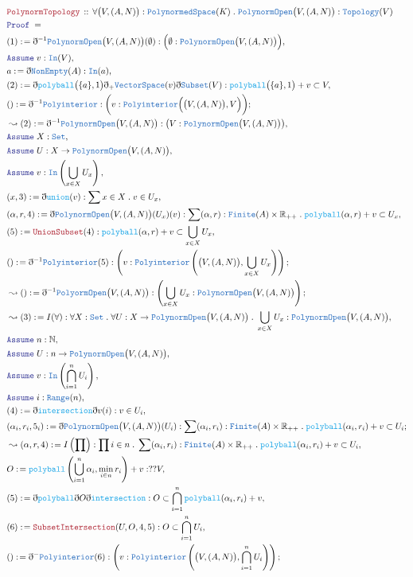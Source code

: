 \documentclass[12pt]{scrartcl}
\newcommand{\TYPE}[1]{\textcolor{NavyBlue}{\mathtt{#1}}}
\newcommand{\FUNC}[1]{\textcolor{Cerulean}{\mathtt{#1}}}
\newcommand{\LOGIC}[1]{\textcolor{Blue}{\mathtt{#1}}}
\newcommand{\THM}[1]{\textcolor{Maroon}{\mathtt{#1}}}
\renewcommand{\.}{\; . \;}
\newcommand{\de}{: \kern 0.1pc =}
\newcommand{\Theorem}[2]{& \THM{#1} \, :: \, #2 \\ & \Proof = \\ }
\newcommand{\Page}[1]{\begin{align*} #1 \end{align*} \newpage   }
\newcommand{ \bd }{ \ByDef }
\newcommand{\Reals}{\mathbb{R} }
\newcommand{\Nat}{\mathbb{N} }
\newcommand{\Set}{\TYPE{Set}}
\newcommand{\Say}[3]{& #1 \de #2 : #3, \\}
\newcommand{\Conclude}[3]{& #1 \de #2 : #3; \\}
\newcommand{\Derive}[3]{& \leadsto #1 \de #2 : #3, \\}
\newcommand{\DeriveConclude}[3]{& \leadsto #1 \de #2 : #3 ; \\}
\newcommand{\A}{\LOGIC{Assume} \;}
\newcommand{\Assume}[2]{& \A #1 : #2, \\}
\newcommand{\ByDef}{\eth}
\newcommand{\Proof}{\LOGIC{Proof} \; }
\newcommand{\PNS}{\TYPE{PolynormedSpace}}
\begin{document}
\Page{
 \Theorem{PolynormTopology}{ \forall \big(V, (A,N) \big) : \PNS(K) \.  \TYPE{PolynormOpen}\big(V, (A,N ) \big)  : \TYPE{Topology}(V)  }
 \Say{(1)}{\bd^{-1} \TYPE{PolynormOpen}\big(V,(A,N)\big)(\emptyset)}{ \Big(  \emptyset : \TYPE{PolynormOpen}\big(V, (A,N ) \big) \Big)}
 \Assume{v}{\TYPE{In}(V)}
 \Say{a}{\bd \TYPE{NonEmpty}(A)}{\TYPE{In}(a)}
 \Say{(2)}{ \bd \FUNC{polyball}\big(\{a\},1 \big) \bd_+ \TYPE{VectorSpace}(v) \bd \TYPE{Subset}(V)}{ \FUNC{polyball}\big(\{a\},1 \big) + v \subset V }
 \Conclude{()}{\bd^{-1} \TYPE{Polyinterior}}{ \bigg( v : \TYPE{Polyinterior}\Big(  \big(V, (A,N ) \big),V \Big) \bigg) }
 \Derive{(2)}{ \bd^{-1} \TYPE{PolynormOpen}\big(V,(A,N)\big)}{\big(  V : \TYPE{PolynormOpen}\big(V, (A,N ) \big) \big)}
 \Assume{X}{\Set}
 \Assume{U}{X \to \TYPE{PolynormOpen}\big(V,(A,N) \big)}
 \Assume{v}{ \TYPE{In} \left( \bigcup_{x \in X} U_x \right)}
 \Say{(x,3)}{\bd \FUNC{union}(v)}{ \sum x \in X \. v \in U_x }
 \Say{ (\alpha,r,4) }{ \bd\TYPE{PolynormOpen}\big(V,(A,N) \big)(U_x)(v)  }{ \sum (\alpha,r) : \TYPE{Finite}(A) \times \Reals_{++} \. \FUNC{polyball}(\alpha,r) + v \subset U_x }
 \Say{(5)}{\THM{UnionSubset}(4)}{\FUNC{polyball}(\alpha,r) + v \subset \bigcup_{x \in X} U_x}
 \Conclude{()}{\bd^{-1} \TYPE{Polyinterior}(5)}{ \left( v : \TYPE{Polyinterior}\left(  \big(V, (A,N ) \big), \bigcup_{x \in X} U_x\right) \right) }
 \DeriveConclude{()}{ \bd^{-1} \TYPE{PolyormOpen}\big(V,(A,N)\big)}{\left(  \bigcup_{x \in X} U_x : \TYPE{PolynormOpen}\big(V, (A,N ) \big) \right)}
 \Derive{(3)}{I(\forall)}{ \forall X : \Set \. \forall U : X \to\TYPE{PolynormOpen}\big(V,(A,N)\big)\. \bigcup_{x \in X} U_x :\TYPE{PolynormOpen}\big(V,(A,N)\big)}
 \Assume{n}{\Nat}
 \Assume{U}{n \to \TYPE{PolynormOpen}\big(V,(A,N)\big)}
 \Assume{v}{\TYPE{In}\left( \bigcap^n_{i = 1} U_i \right)}
 \Assume{ i }{\TYPE{Range}(n)}
 \Say{(4)}{\bd \FUNC{intersection} \bd v (i)}{v \in U_i }
 \Conclude{ (\alpha_i,r_i,5_i) }{ \bd \TYPE{PolynormOpen}\big(V,(A,N)\big)(U_i)  }{ \sum (\alpha_i,r_i) : \TYPE{Finite}(A) \times \Reals_{++} \. \FUNC{polyball}(\alpha_i,r_i) + v \subset U_i  }
 \Derive{(\alpha,r,4)}{ I\left( \prod \right)  }{ \prod i \in n \.  \sum (\alpha_i,r_i) : \TYPE{Finite}(A) \times \Reals_{++} \. \FUNC{polyball}(\alpha_i,r_i) + v \subset U_i}
 \Say{O}{ \FUNC{polyball}\left( \bigcup^n_{i = 1} \alpha_i, \min_{i \in n} r_i   \right) + v }{?? V}
 \Say{(5)}{ \bd \FUNC{polyball} \bd O \bd \FUNC{intersection} }{ O \subset \bigcap^n_{i = 1} \FUNC{polyball}(\alpha_i,r_i) + v }
 \Say{(6)}{ \THM{SubsetIntersection}(U,O,4,5) }{O \subset \bigcap^n_{i = 1} U_i}
 \Conclude{()}{\bd^{-} \TYPE{Polyinterior}(6)}{ \left( v : \TYPE{Polyinterior}\left(  \big(V, (A,N ) \big), \bigcap_{i = 1}^n U_i\right) \right) }
}
\end{document}
